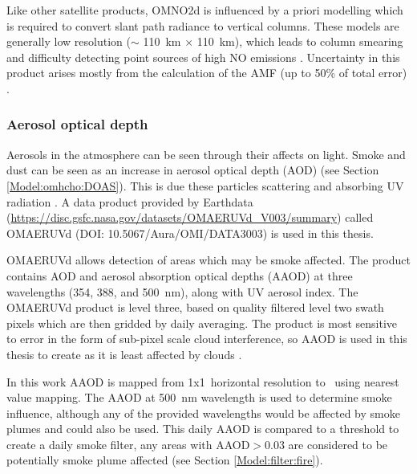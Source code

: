       
      
      
      Like other satellite products, OMNO2d is influenced by a priori modelling which is required to convert slant path radiance to vertical columns.
      These models are generally low resolution ($\sim$ 110~km $\times$ 110~km), which leads to column smearing and difficulty detecting point sources of high NO emissions \parencite{Goldberg2018}.
      Uncertainty in this product arises mostly from the calculation of the AMF (up to 50\% of total error) \parencite{Lorente2017}.
    
    \subsubsection{Aerosol optical depth}
      \label{Model:datasets:OMAERUVd}
      
      Aerosols in the atmosphere can be seen through their affects on light. 
      Smoke and dust can be seen as an increase in aerosol optical depth (AOD) (see Section \ref{Model:omhcho:DOAS}).
      This is due these particles scattering and absorbing UV radiation \parencite{Ahn2008}.
      A data product provided by Earthdata (\url{https://disc.gsfc.nasa.gov/datasets/OMAERUVd_V003/summary}) called OMAERUVd (DOI: 10.5067/Aura/OMI/DATA3003) is used in this thesis. 
      
      
      OMAERUVd allows detection of areas which may be smoke affected.
      The product contains AOD and aerosol absorption optical depths (AAOD) at three wavelengths (354, 388, and 500~nm), along with UV aerosol index.
      The OMAERUVd product is level three, based on quality filtered level two swath pixels which are then gridded by daily averaging.
      The product is most sensitive to error in the form of sub-pixel scale cloud interference, so AAOD is used in this thesis to create as it is least affected by clouds \parencite{Ahn2008}.
      
      In this work AAOD is mapped from 1x1\degr ~horizontal resolution to \highhr ~using nearest value mapping.
      The AAOD at 500~nm wavelength is used to determine smoke influence, although any of the provided wavelengths would be affected by smoke plumes and could also be used.
      This daily AAOD is compared to a threshold to create a daily smoke filter, any areas with AAOD$>0.03$ are considered to be potentially smoke plume affected (see Section \ref{Model:filter:fire}).
    
